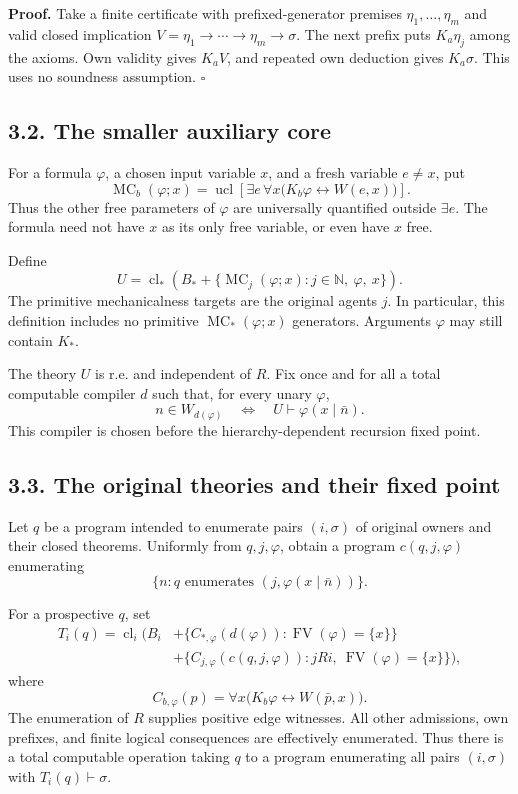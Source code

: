 \documentclass[
  11pt,
  letterpaper,
]{article}
\begin{document}
\textbf{Proof.} Take a finite certificate with prefixed-generator
premises \(\eta_1,\ldots,\eta_m\) and valid closed implication
\(V=\eta_1\to\cdots\to\eta_m\to\sigma\). The next prefix puts
\(K_a\eta_j\) among the axioms. Own validity gives \(K_aV\), and
repeated own deduction gives \(K_a\sigma\). This uses no soundness
assumption. \(\square\)

\subsection{3.2. The smaller auxiliary
core}\label{the-smaller-auxiliary-core}

For a formula \(\varphi\), a chosen input variable \(x\), and a fresh
variable \(e\ne x\), put \[
\operatorname{MC}_b(\varphi;x)=
\operatorname{ucl}\left[
\exists e\,\forall x
 \bigl(K_b\varphi\leftrightarrow W(e,x)\bigr)\right].
\tag{S2}
\] Thus the other free parameters of \(\varphi\) are universally
quantified outside \(\exists e\). The formula need not have \(x\) as its
only free variable, or even have \(x\) free.

Define \[
U=
\operatorname{cl}_*\left(
 B_*+
 \{\operatorname{MC}_j(\varphi;x):
                  j\in\mathbb N,\ \varphi,\ x\}
 \right).
\tag{S3}
\] The primitive mechanicalness targets are the original agents \(j\).
In particular, this definition includes no primitive
\(\operatorname{MC}_*(\varphi;x)\) generators. Arguments \(\varphi\) may
still contain \(K_*\).

The theory \(U\) is r.e. and independent of \(R\). Fix once and for all
a total computable compiler \(d\) such that, for every unary
\(\varphi\), \[
n\in W_{d(\varphi)}
\quad\Longleftrightarrow\quad
U\vdash\varphi(x\mid\bar n).
\tag{S4}
\] This compiler is chosen before the hierarchy-dependent recursion
fixed point.

\subsection{3.3. The original theories and their fixed
point}\label{the-original-theories-and-their-fixed-point}

Let \(q\) be a program intended to enumerate pairs \((i,\sigma)\) of
original owners and their closed theorems. Uniformly from
\(q,j,\varphi\), obtain a program \(c(q,j,\varphi)\) enumerating \[
\{n:q\text{ enumerates }(j,\varphi(x\mid\bar n))\}.
\]

For a prospective \(q\), set \[
\begin{split}
T_i(q)=\operatorname{cl}_i\bigl(
 B_i
 &+\{C_{*,\varphi}(d(\varphi)):\operatorname{FV}(\varphi)=\{x\}\}\\
 &+\{C_{j,\varphi}(c(q,j,\varphi)):
                    jRi,\ \operatorname{FV}(\varphi)=\{x\}\}
\bigr),
\end{split}
\tag{S5}
\] where \[
C_{b,\varphi}(p)=
\forall x\bigl(K_b\varphi\leftrightarrow W(\bar p,x)\bigr).
\tag{S6}
\] The enumeration of \(R\) supplies positive edge witnesses. All other
admissions, own prefixes, and finite logical consequences are
effectively enumerated. Thus there is a total computable operation
taking \(q\) to a program enumerating all pairs \((i,\sigma)\) with
\(T_i(q)\vdash\sigma\).
\end{document}
